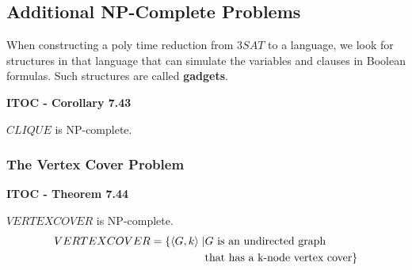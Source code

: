 \subsection{Additional NP-Complete Problems}

When constructing a poly time reduction from $3SAT$ to a language, we look for structures in that language that can simulate the variables and clauses in Boolean formulas. Such structures are called \textbf{gadgets}.

\begin{shaded}
\textbf{ITOC - Corollary 7.43}

\medskip
$CLIQUE$ is NP-complete.
\end{shaded}

\subsubsection{The Vertex Cover Problem}

\label{lang:VERTEXCOVER_NP}
\label{lang:VERTEXCOVER_NPC}
\begin{shaded}
\textbf{ITOC - Theorem 7.44}

\medskip
$VERTEXCOVER$ is NP-complete.
\begin{align*}
VERTEXCOVER = \{ \langle{G, k}\rangle \mid &\text{$G$ is an undirected graph} \\
& \text{that has a k-node vertex cover}\}
\end{align*}
\end{shaded}

